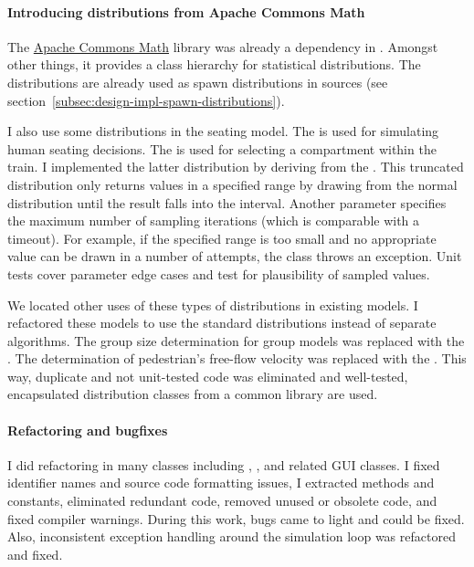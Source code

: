 \paragraph{Introducing distributions from Apache Commons Math}

The \href{http://commons.apache.org/proper/commons-math/}{Apache Commons Math}
library was already a dependency in \vadere.
Amongst other things, it provides a class hierarchy for statistical
distributions.
The distributions are already used as spawn distributions in sources (see
section~\ref{subsec:design-impl-spawn-distributions}).

I also use some distributions in the seating model.
The  is used for simulating human seating
decisions.
The  is used for selecting a compartment
within the train.
I implemented the latter distribution by deriving from the
.
This truncated distribution only returns values in a specified range by drawing
from the normal distribution until the result falls into the interval.
Another parameter specifies the maximum number of sampling iterations (which is
comparable with a timeout).
For example, if the specified range is too small and no appropriate value can be
drawn in a number of attempts, the class throws an exception.
Unit tests cover parameter edge cases and test for plausibility of sampled
values.

We located other uses of these types of distributions in existing models.
I refactored these models to use the standard distributions instead of separate
algorithms.
The group size determination for group models was replaced with the
.
The determination of pedestrian's free-flow velocity was replaced with the
.
This way, duplicate and not unit-tested code was eliminated and well-tested,
encapsulated distribution classes from a common library are used.

\paragraph{Refactoring and bugfixes}

I did refactoring in many classes including , ,
and related \acs{GUI} classes.
I fixed identifier names and source code formatting issues, I extracted methods
and constants, eliminated redundant code, removed unused or obsolete code, and
fixed compiler warnings.
During this work, bugs came to light and could be fixed.
Also, inconsistent exception handling around the simulation loop was refactored
and fixed.

